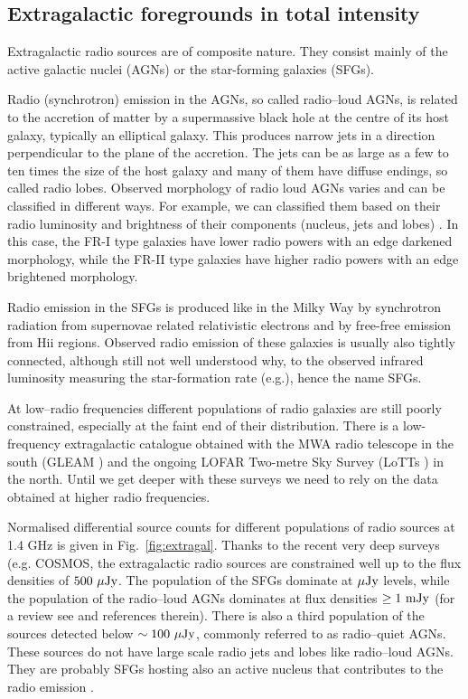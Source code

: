 \subsection{Extragalactic foregrounds in total intensity}
Extragalactic radio sources are of composite nature.  They consist mainly of the active galactic nuclei (AGNs) or the star-forming galaxies (SFGs). 

Radio (synchrotron) emission in the AGNs, so called radio--loud AGNs, is related to the accretion of matter by a supermassive black hole at the centre of its host galaxy, typically an elliptical galaxy.  This produces narrow  jets in a direction perpendicular to the plane of the accretion. The jets can be as large as a few to ten times the size 
of the host galaxy and many of them have diffuse endings, so called radio lobes. Observed morphology of radio loud AGNs varies and can be classified in different ways. For example, we can classified them based on their radio luminosity and brightness of their components (nucleus, jets and lobes) \cite{fanaroff74}. In this case, the FR-I type galaxies  have lower radio powers with an edge darkened morphology, while the FR-II type galaxies have higher radio powers with an edge brightened morphology.

Radio emission in the SFGs is produced like in the Milky Way by synchrotron radiation from supernovae related relativistic electrons and by free-free emission from H{\sc ii} regions. Observed radio emission of these galaxies is usually also tightly connected, although still not well understood why, to the observed infrared luminosity measuring the star-formation rate (e.g.\cite{condon92, helou85, jarvis10}), hence the name SFGs. 

At low--radio frequencies different populations of radio galaxies are still poorly constrained, especially at the faint end of their distribution. There is a low-frequency extragalactic catalogue obtained with the MWA radio telescope in the south (GLEAM \cite{hurleywalker17}) and the ongoing LOFAR Two-metre Sky Survey (LoTTs \cite{shimwell17, shimwell19}) in the north. Until we get deeper with these surveys we need to rely on the data obtained at higher radio frequencies.

Normalised differential source counts for different populations of radio sources at 1.4 GHz is given in Fig.~\ref{fig:extragal}. Thanks to the recent very deep surveys (e.g. COSMOS, \cite{bondi08, novak18, smolcic17b, smolcic17a, smolcic17c} the extragalactic radio sources are constrained well up to the flux densities of $500~{\rm \mu Jy}$. The population of the SFGs dominate at $\mu{\rm Jy}$ levels, while the population of the radio--loud AGNs dominates at flux densities $\geq1~{{\rm mJy}}$ (for a review see \cite{prandoniIAUS333} and references therein). There is also a third population of the sources detected below $\sim100~{\rm \mu Jy}$, commonly referred to as radio--quiet AGNs. These sources do not have large scale radio jets and lobes like radio--loud AGNs. They are probably SFGs hosting also an active nucleus that contributes to the radio emission \cite{ceraj18, delvecchio17}. 

